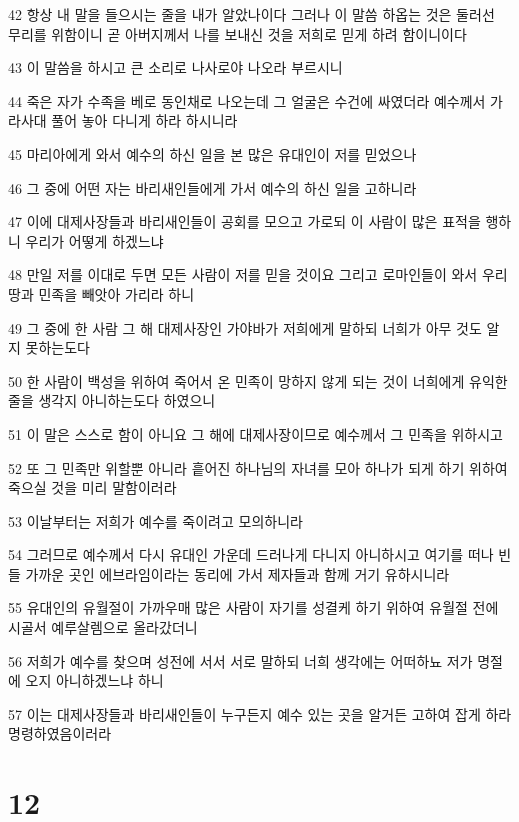 \par 42 항상 내 말을 들으시는 줄을 내가 알았나이다 그러나 이 말씀 하옵는 것은 둘러선 무리를 위함이니 곧 아버지께서 나를 보내신 것을 저희로 믿게 하려 함이니이다
\par 43 이 말씀을 하시고 큰 소리로 나사로야 나오라 부르시니
\par 44 죽은 자가 수족을 베로 동인채로 나오는데 그 얼굴은 수건에 싸였더라 예수께서 가라사대 풀어 놓아 다니게 하라 하시니라
\par 45 마리아에게 와서 예수의 하신 일을 본 많은 유대인이 저를 믿었으나
\par 46 그 중에 어떤 자는 바리새인들에게 가서 예수의 하신 일을 고하니라
\par 47 이에 대제사장들과 바리새인들이 공회를 모으고 가로되 이 사람이 많은 표적을 행하니 우리가 어떻게 하겠느냐
\par 48 만일 저를 이대로 두면 모든 사람이 저를 믿을 것이요 그리고 로마인들이 와서 우리 땅과 민족을 빼앗아 가리라 하니
\par 49 그 중에 한 사람 그 해 대제사장인 가야바가 저희에게 말하되 너희가 아무 것도 알지 못하는도다
\par 50 한 사람이 백성을 위하여 죽어서 온 민족이 망하지 않게 되는 것이 너희에게 유익한 줄을 생각지 아니하는도다 하였으니
\par 51 이 말은 스스로 함이 아니요 그 해에 대제사장이므로 예수께서 그 민족을 위하시고
\par 52 또 그 민족만 위할뿐 아니라 흩어진 하나님의 자녀를 모아 하나가 되게 하기 위하여 죽으실 것을 미리 말함이러라
\par 53 이날부터는 저희가 예수를 죽이려고 모의하니라
\par 54 그러므로 예수께서 다시 유대인 가운데 드러나게 다니지 아니하시고 여기를 떠나 빈 들 가까운 곳인 에브라임이라는 동리에 가서 제자들과 함께 거기 유하시니라
\par 55 유대인의 유월절이 가까우매 많은 사람이 자기를 성결케 하기 위하여 유월절 전에 시골서 예루살렘으로 올라갔더니
\par 56 저희가 예수를 찾으며 성전에 서서 서로 말하되 너희 생각에는 어떠하뇨 저가 명절에 오지 아니하겠느냐 하니
\par 57 이는 대제사장들과 바리새인들이 누구든지 예수 있는 곳을 알거든 고하여 잡게 하라 명령하였음이러라

\chapter{12}

